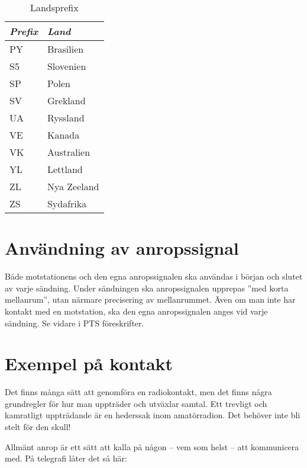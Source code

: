 \begin{table*}[ht]
\begin{center}
\begin{minipage}{.3\linewidth}
      \begin{tabular}{ll}
        \emph{Prefix} & \emph{Land} \\
        \hline
        PY            & Brasilien   \\
        S5            & Slovenien   \\
        SP            & Polen       \\
        SV            & Grekland       \\
        UA            & Ryssland    \\
        VE            & Kanada      \\
        VK            & Australien  \\
        YL            & Lettland    \\
        ZL            & Nya Zeeland    \\
        ZS            & Sydafrika   \\
      \end{tabular}
    \end{minipage}
    \caption{Landsprefix}
    \label{tab:landsprefix}
  \end{center}
\end{table*}

\section{Användning av anropssignal}

Både motstationens och den egna anropssignalen ska användas i början
och slutet av varje sändning.
Under sändningen ska anropssignalen upprepas ''med korta mellanrum'', utan
närmare precisering av mellanrummet.
Även om man inte har kontakt med en motstation, ska den egna anropssignalen
anges vid varje sändning.
Se vidare i PTS föreskrifter.

\section{Exempel på kontakt}

Det finns många sätt att genomföra en radiokontakt, men det finns några
grundregler för hur man uppträder och utväxlar samtal.
Ett trevligt och kamratligt uppträdande är en hederssak inom amatörradion.
Det behöver inte bli stelt för den skull!

Allmänt anrop är ett sätt att kalla på någon
-- vem som helst -- att kommunicera med.
På telegrafi låter det så här:


